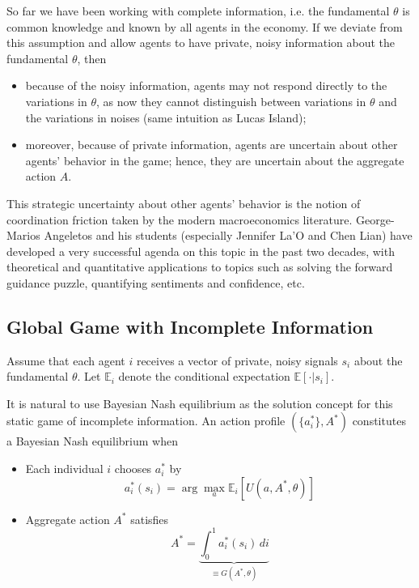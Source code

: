 \documentclass[12pt]{article}
\begin{document}
So far we have been working with complete information, i.e. the fundamental $\theta$ is common knowledge and known by all agents in the economy. If we deviate from this assumption and allow agents to have private, noisy information about the fundamental $\theta$, then
\begin{itemize}
	\item because of the noisy information, agents may not respond directly to the variations in $\theta$, as now they cannot distinguish between variations in $\theta$ and the variations in noises (same intuition as Lucas Island);
	\item moreover, because of private information, agents are uncertain about other agents' behavior in the game; hence, they are uncertain about the aggregate action $A$. 
\end{itemize}
This strategic uncertainty about other agents' behavior is the notion of coordination friction taken by the modern macroeconomics literature. George-Marios Angeletos and his students (especially Jennifer La'O and Chen Lian) have developed a very successful agenda on this topic in the past two decades, with theoretical and quantitative applications to topics such as solving the forward guidance puzzle, quantifying sentiments and confidence, etc. 

\subsection{Global Game with Incomplete Information}

Assume that each agent $i$ receives a vector of private, noisy signals $s_i$ about the fundamental $\theta$. Let $\mathbb{E}_i$ denote the conditional expectation $\mathbb{E}[\cdot|s_i]$.   

It is natural to use Bayesian Nash equilibrium as the solution concept for this static game of incomplete information. An action profile $(\{a_i^*\}, A^*)$ constitutes a Bayesian Nash equilibrium when 
\begin{itemize}
	\item Each individual $i$ chooses $a_i^*$ by
	\begin{equation}
		a_i^*(s_i) = \arg \max_a \mathbb{E}_i [U(a, A^*, \theta)]
	\end{equation}
\item Aggregate action $A^*$ satisfies
\begin{equation}
	A^* = \underbrace{\int_0^1 a_i^*(s_i) \, di}_{\equiv G(A^*, \theta)}
\end{equation}
\end{itemize}
\end{document}
